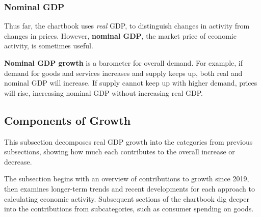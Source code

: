 \subsubsection*{Nominal GDP}
\begin{minipage}{0.76\textwidth} 
\small Thus far, the chartbook uses \textit{real} GDP, to distinguish changes in activity from changes in prices. However, \textbf{nominal GDP}, the market price of economic activity, is sometimes useful. 

\textbf{Nominal GDP growth} is a barometer for overall demand. For example, if demand for goods and services increases and supply keeps up, both real and nominal GDP will increase. If supply cannot keep up with higher demand, prices will rise, increasing nominal GDP without increasing real GDP.


\vspace{0.5mm}

\vspace{3.0cm}

\hspace{5mm} 

\vspace{1mm}

\hypertarget{oegc}{\label{oegc}}   
\end{minipage}
\subsection*{Components of Growth}
\vspace{-0.5mm}

\begin{minipage}{0.76\textwidth} 
\small This subsection decomposes real GDP growth into the categories from previous subsections, showing how much each contributes to the overall increase or decrease.

The subsection begins with an overview of contributions to growth since 2019, then examines longer-term trends and recent developments for each approach to calculating economic activity. Subsequent sections of the chartbook dig deeper into the contributions from subcategories, such as consumer spending on goods. 
\end{minipage}
\vspace{0.5mm}

